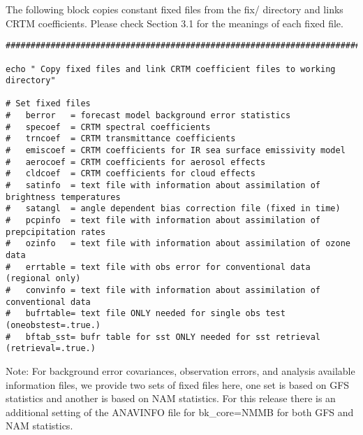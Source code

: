 The following block copies constant fixed files from the fix/ directory and links CRTM coefficients. Please check Section 3.1 for the meanings of each fixed file. 

\begin{footnotesize}
\begin{verbatim}
##################################################################################

echo " Copy fixed files and link CRTM coefficient files to working directory"

# Set fixed files
#   berror   = forecast model background error statistics
#   specoef  = CRTM spectral coefficients
#   trncoef  = CRTM transmittance coefficients
#   emiscoef = CRTM coefficients for IR sea surface emissivity model
#   aerocoef = CRTM coefficients for aerosol effects
#   cldcoef  = CRTM coefficients for cloud effects
#   satinfo  = text file with information about assimilation of brightness temperatures
#   satangl  = angle dependent bias correction file (fixed in time)
#   pcpinfo  = text file with information about assimilation of prepcipitation rates
#   ozinfo   = text file with information about assimilation of ozone data
#   errtable = text file with obs error for conventional data (regional only)
#   convinfo = text file with information about assimilation of conventional data
#   bufrtable= text file ONLY needed for single obs test (oneobstest=.true.)
#   bftab_sst= bufr table for sst ONLY needed for sst retrieval (retrieval=.true.)
\end{verbatim}
\end{footnotesize}

Note: For background error covariances, observation errors, and analysis available information files, we provide two sets of fixed files here, one set is based on GFS statistics and another is based on NAM statistics. For this release there is an additional setting of the ANAVINFO file for bk\_core=NMMB for both GFS and NAM statistics.

